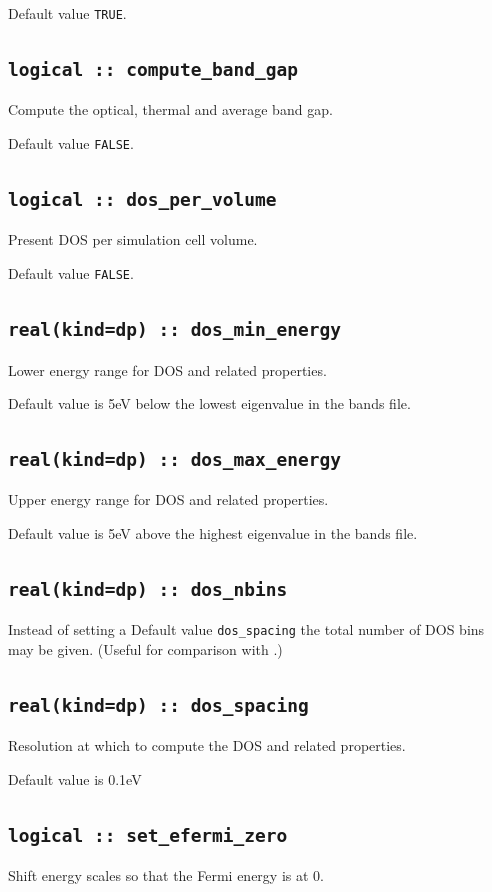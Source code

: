 \documentclass[a4paper,11pt,twoside]{book}
\begin{document}
{Default value \verb#TRUE#.

\subsection[compute\_band\_energy]{\tt logical :: compute\_band\_gap}
Compute the optical, thermal and average band gap.

Default value \verb#FALSE#.

\subsection[DOS\_per\_volume]{\tt logical :: dos\_per\_volume}
Present DOS per simulation cell volume.

Default value \verb#FALSE#.

\subsection[dos\_min\_energy]{\tt real(kind=dp) :: dos\_min\_energy}
Lower energy range for DOS and related properties.

Default value is 5eV below the lowest eigenvalue in the bands file.

\subsection[dos\_max\_energy]{\tt real(kind=dp) :: dos\_max\_energy}
Upper energy range for DOS and related properties.

Default value is 5eV above the highest eigenvalue in the bands file.


\subsection[dos\_nbins]{\tt real(kind=dp) :: dos\_nbins}
Instead of setting a Default value \verb#dos_spacing# the total number of DOS bins may be given.  (Useful for comparison with \lindos.)

\subsection[dos\_spacing]{\tt real(kind=dp) :: dos\_spacing}
Resolution at which to compute the DOS and related properties.

Default value is 0.1eV

\subsection[set\_efermi\_zero]{\tt logical :: set\_efermi\_zero}
Shift energy scales so that the Fermi energy is at 0.

}
\end{document}

